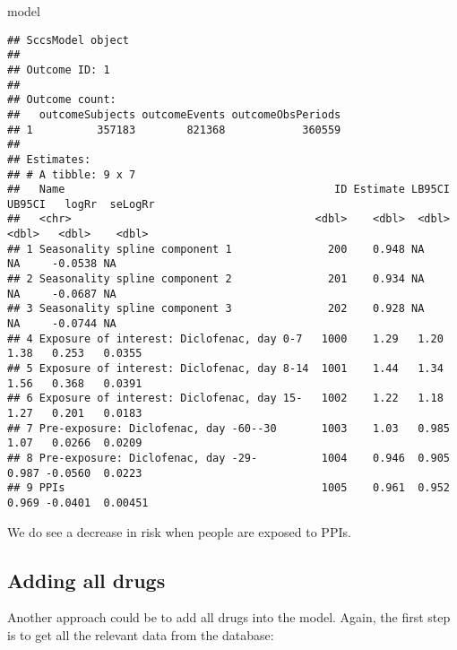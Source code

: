 \documentclass[
]{article}
\newenvironment{Shaded}{\begin{snugshade}}{\end{snugshade}}
\newcommand{\NormalTok}[1]{#1}
\begin{document}
\begin{Shaded}
\begin{Highlighting}[]
\NormalTok{model}
\end{Highlighting}
\end{Shaded}

\begin{verbatim}
## SccsModel object
## 
## Outcome ID: 1
## 
## Outcome count:
##   outcomeSubjects outcomeEvents outcomeObsPeriods
## 1          357183        821368            360559
## 
## Estimates:
## # A tibble: 9 x 7
##   Name                                          ID Estimate LB95CI UB95CI   logRr  seLogRr
##   <chr>                                      <dbl>    <dbl>  <dbl>  <dbl>   <dbl>    <dbl>
## 1 Seasonality spline component 1               200    0.948 NA     NA     -0.0538 NA      
## 2 Seasonality spline component 2               201    0.934 NA     NA     -0.0687 NA      
## 3 Seasonality spline component 3               202    0.928 NA     NA     -0.0744 NA      
## 4 Exposure of interest: Diclofenac, day 0-7   1000    1.29   1.20   1.38   0.253   0.0355 
## 5 Exposure of interest: Diclofenac, day 8-14  1001    1.44   1.34   1.56   0.368   0.0391 
## 6 Exposure of interest: Diclofenac, day 15-   1002    1.22   1.18   1.27   0.201   0.0183 
## 7 Pre-exposure: Diclofenac, day -60--30       1003    1.03   0.985  1.07   0.0266  0.0209 
## 8 Pre-exposure: Diclofenac, day -29-          1004    0.946  0.905  0.987 -0.0560  0.0223 
## 9 PPIs                                        1005    0.961  0.952  0.969 -0.0401  0.00451
\end{verbatim}

We do see a decrease in risk when people are exposed to PPIs.

\hypertarget{adding-all-drugs}{%
\subsection{Adding all drugs}\label{adding-all-drugs}}

Another approach could be to add all drugs into the model. Again, the
first step is to get all the relevant data from the database:
\end{document}
